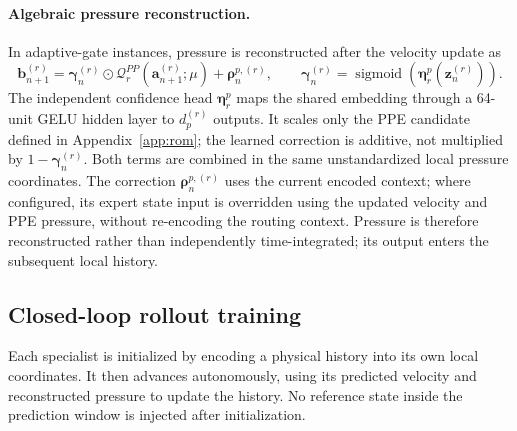 \paragraph{Algebraic pressure reconstruction.}
In adaptive-gate instances, pressure is
reconstructed after the velocity update as
\begin{equation}
  \bm b_{n+1}^{(r)}
  =\bm\gamma_n^{(r)}\odot
     \mathcal Q_r^{PP}(\bm a_{n+1}^{(r)};\mu)
   +\bm\rho_n^{p,(r)},
  \qquad
  \bm\gamma_n^{(r)}
  =\operatorname{sigmoid}(\bm\eta_r^p(\bm z_n^{(r)})).
  \label{eq:main_pressure_closure}
\end{equation}
The independent confidence head $\bm\eta_r^p$ maps the shared
embedding through a 64-unit GELU hidden layer to $d_p^{(r)}$ outputs. It scales only the PPE candidate defined in Appendix~\ref{app:rom}; the learned correction is additive, not multiplied by $1-\bm\gamma_n^{(r)}$. Both terms are combined in the same unstandardized local pressure coordinates. The correction $\bm\rho_n^{p,(r)}$ uses the current encoded context; where configured, its expert state input is overridden using the updated velocity and
PPE pressure, without re-encoding the routing context.
Pressure is therefore reconstructed rather than independently
time-integrated; its output enters the subsequent local history.


\subsection{Closed-loop rollout training}
\label{sec:rollout_training}

Each specialist is initialized by encoding a physical history into its own local coordinates. It then advances autonomously, using its predicted velocity and reconstructed pressure to update the history. No reference state inside the prediction window is injected after initialization.

